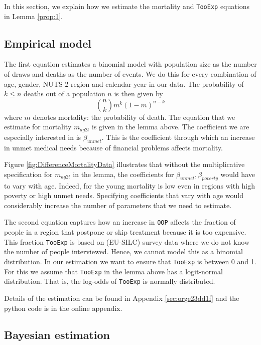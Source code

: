 \documentclass[a4paper,12pt]{article}
\begin{document}
In this section, we explain how we estimate the mortality and \texttt{TooExp} equations in Lemma \ref{prop:1}.

\subsection{Empirical model}
\label{sec:org2722cd5}

The first equation estimates a binomial model with population size as the number of draws and deaths as the number of events. We do this for every combination of age, gender, NUTS 2 region and calendar year in our data. The probability of \(k \leq n\) deaths out of a population \(n\) is then given by
\begin{equation}
\label{eq:binomial}
\binom{n}{k} m^{k}(1-m)^{n-k}
\end{equation}
where \(m\) denotes mortality: the probability of death. The equation that we estimate for mortality \(m_{ag2t}\) is given in the lemma above. The coefficient we are especially interested in is \(\beta_{unmet}\). This is the coefficient through which an increase in unmet medical needs because of financial problems affects mortality.

Figure \ref{fig:DifferenceMortalityData} illustrates that without the multiplicative specification for \(m_{ag2t}\) in the lemma, the coefficients for \(\beta_{unmet}, \beta_{poverty}\) would have to vary with age. Indeed, for the young mortality is low even in regions with high poverty or high unmet needs. Specifying coefficients that vary with age would considerably increase the number of parameters that we need to estimate. 

The second equation captures how an increase in \texttt{OOP} affects the fraction of people in a region that postpone or skip treatment because it is too expensive. This fraction \texttt{TooExp} is based on (EU-SILC) survey data where we do not know the number of people interviewed. Hence, we cannot model this as a binomial distribution. In our estimation we want to ensure that \texttt{TooExp} is between 0 and 1. For this we assume that \texttt{TooExp} in the lemma above has a logit-normal distribution. That is, the log-odds of \texttt{TooExp} is normally distributed.

Details of the estimation can be found in Appendix \ref{sec:orge23dd1f} and the python code is in the online appendix.


\subsection{Bayesian estimation}
\label{sec:org4b233de}
\end{document}
